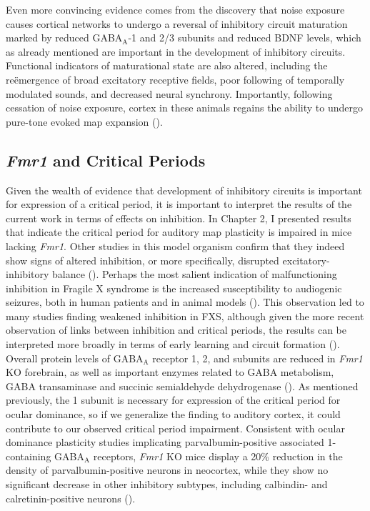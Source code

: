 Even more convincing evidence comes from the discovery that noise exposure causes cortical networks to undergo a reversal of inhibitory circuit maturation marked by reduced GABA$_\mathrm{A}$-\textalpha{}1 and \textbeta{}2/3 subunits and reduced BDNF levels, which as already mentioned are important in the development of inhibitory circuits. Functional indicators of maturational state are also altered, including the re\"emergence of broad excitatory receptive fields, poor following of temporally modulated sounds, and decreased neural synchrony. Importantly, following cessation of noise exposure, cortex in these animals regains the ability to undergo pure-tone evoked map expansion (\cite{Zhou2011}).

\subsection{\textit{Fmr1} and Critical Periods}
Given the wealth of evidence that development of inhibitory circuits is important for expression of a critical period, it is important to interpret the results of the current work in terms of effects on inhibition. In Chapter 2, I presented results that indicate the critical period for auditory map plasticity is impaired in mice lacking \textit{Fmr1}. Other studies in this model organism confirm that they indeed show signs of altered inhibition, or more specifically, disrupted excitatory-inhibitory balance (\cite{Gibson2008}). Perhaps the most salient indication of malfunctioning inhibition in Fragile X syndrome is the increased susceptibility to audiogenic seizures, both in human patients and in animal models (\cite{Hagerman, Chen2001}). This observation led to many studies finding weakened inhibition in FXS, although given the more recent observation of links between inhibition and critical periods, the results can be interpreted more broadly in terms of early learning and circuit formation (\cite{ElIdrissi2005}). Overall protein levels of GABA$_\mathrm{A}$ receptor \textalpha{}1, \textbeta{}2, and \textdelta{} subunits are reduced in \textit{Fmr1} KO forebrain, as well as important enzymes related to GABA metabolism, GABA transaminase and succinic semialdehyde dehydrogenase (\cite{Adusei2010}). As mentioned previously, the \textalpha{}1 subunit is necessary for expression of the critical period for ocular dominance, so if we generalize the finding to auditory cortex, it could contribute to our observed critical period impairment. Consistent with ocular dominance plasticity studies implicating parvalbumin-positive associated \textalpha{}1-containing GABA$_\mathrm{A}$ receptors, \textit{Fmr1} KO mice display a 20\% reduction in the density of parvalbumin-positive neurons in neocortex, while they show no significant decrease in other inhibitory subtypes, including calbindin- and calretinin-positive neurons (\cite{Selby2007}).


